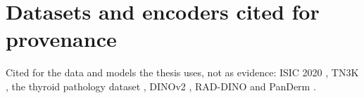 \documentclass[11pt,a4paper]{article}
\begin{document}
\section{Datasets and encoders cited for provenance}\label{app:provenance}
Cited for the data and models the thesis uses, not as evidence: ISIC 2020 \citep{rotemberg2021isic2020}, TN3K
\citep{gong2021tn3k}, the thyroid pathology dataset \citep{hou2024thyus2path}, DINOv2 \citep{oquab2024dinov2},
RAD-DINO \citep{perezgarcia2025raddino} and PanDerm \citep{yan2025panderm}.



\end{document}
